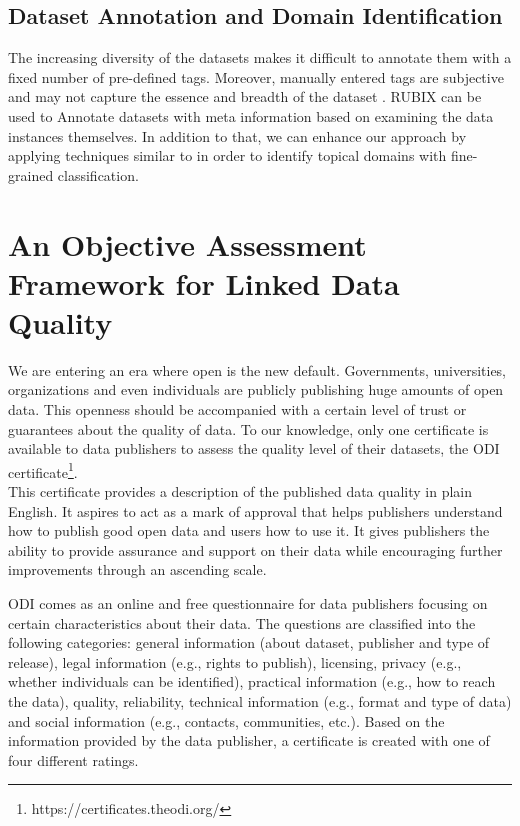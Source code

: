\documentclass[onecolumn, crcready]{iosart2c}
\begin{document}
\subsection{Dataset Annotation and Domain Identification}

The increasing diversity of the datasets makes it difficult to annotate them with a fixed number of pre-defined tags. Moreover, manually entered tags are subjective and may not capture the essence and breadth of the dataset \cite{AutomaticDomainIdentification}. RUBIX can be used to Annotate datasets with meta information based on examining the data instances themselves. In addition to that, we can enhance our approach by applying techniques similar to \cite{AutomaticDomainIdentification} in order to identify topical domains with fine-grained classification.



\section{An Objective Assessment Framework for Linked Data Quality}

We are entering an era where open is the new default. Governments, universities, organizations and even individuals are publicly publishing huge amounts of open data.  This openness should be accompanied with a certain level of trust or guarantees about the quality of data.  To our knowledge, only one certificate is available to data publishers to assess the quality level of their datasets, the ODI certificate\footnote {https://certificates.theodi.org/}.\\

This certificate provides a description of the published data quality in plain English. It aspires to act as a mark of approval that helps publishers understand how to publish good open data and users how to use it. It gives publishers the ability to provide assurance and support on their data while encouraging further improvements through an ascending scale.

ODI comes as an online and free questionnaire for data publishers focusing on certain characteristics about their data. The questions are classified into the following categories: general information (about dataset, publisher and type of release), legal information (e.g., rights to publish), licensing, privacy (e.g., whether individuals can be identified), practical information (e.g., how to reach the data), quality, reliability, technical information (e.g., format and type of data) and social information (e.g., contacts, communities, etc.). Based on the information provided  by the data  publisher,  a certificate  is created  with one of four different ratings.\\
\end{document}
